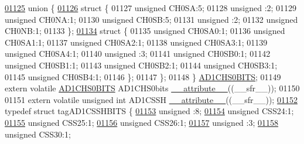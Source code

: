 \begin{DoxyCode}
\hypertarget{a00009_source_l01125}{}\hyperlink{a00009}{01125}   \textcolor{keyword}{union }\{
\hypertarget{a00009_source_l01126}{}\hyperlink{a00009}{01126}     \textcolor{keyword}{struct }\{
01127       \textcolor{keywordtype}{unsigned} CH0SA:5;
01128       \textcolor{keywordtype}{unsigned} :2;
01129       \textcolor{keywordtype}{unsigned} CH0NA:1;
01130       \textcolor{keywordtype}{unsigned} CH0SB:5;
01131       \textcolor{keywordtype}{unsigned} :2;
01132       \textcolor{keywordtype}{unsigned} CH0NB:1;
01133     \};
\hypertarget{a00009_source_l01134}{}\hyperlink{a00009}{01134}     \textcolor{keyword}{struct }\{
01135       \textcolor{keywordtype}{unsigned} CH0SA0:1;
01136       \textcolor{keywordtype}{unsigned} CH0SA1:1;
01137       \textcolor{keywordtype}{unsigned} CH0SA2:1;
01138       \textcolor{keywordtype}{unsigned} CH0SA3:1;
01139       \textcolor{keywordtype}{unsigned} CH0SA4:1;
01140       \textcolor{keywordtype}{unsigned} :3;
01141       \textcolor{keywordtype}{unsigned} CH0SB0:1;
01142       \textcolor{keywordtype}{unsigned} CH0SB1:1;
01143       \textcolor{keywordtype}{unsigned} CH0SB2:1;
01144       \textcolor{keywordtype}{unsigned} CH0SB3:1;
01145       \textcolor{keywordtype}{unsigned} CH0SB4:1;
01146     \};
01147   \};
01148 \} \hyperlink{a00008_d0/d89/a00071}{AD1CHS0BITS};
01149 \textcolor{keyword}{extern} \textcolor{keyword}{volatile} \hyperlink{a00008_d0/d89/a00071}{AD1CHS0BITS} AD1CHS0bits \hyperlink{a00009_a493c46f03454991ccc5aa7a6e1dfb2a7}{\_\_attribute\_\_}((\_\_sfr\_\_));
01150 
01151 \textcolor{keyword}{extern} \textcolor{keyword}{volatile} \textcolor{keywordtype}{unsigned} \textcolor{keywordtype}{int}  AD1CSSH \hyperlink{a00009_a493c46f03454991ccc5aa7a6e1dfb2a7}{\_\_attribute\_\_}((\_\_sfr\_\_));
\hypertarget{a00009_source_l01152}{}\hyperlink{a00008}{01152} \textcolor{keyword}{typedef} \textcolor{keyword}{struct }tagAD1CSSHBITS \{
\hypertarget{a00009_source_l01153}{}\hyperlink{a00008_adf71f3d8410c1f1dbbc96680a92c49af}{01153}   \textcolor{keywordtype}{unsigned} :8;
\hypertarget{a00009_source_l01154}{}\hyperlink{a00008_a179594fd85a0024675d34825b096e673}{01154}   \textcolor{keywordtype}{unsigned} CSS24:1;
\hypertarget{a00009_source_l01155}{}\hyperlink{a00008_a23d4f62cc0a980ee2d9fa1110338c65a}{01155}   \textcolor{keywordtype}{unsigned} CSS25:1;
\hypertarget{a00009_source_l01156}{}\hyperlink{a00008_a3aa55caf4abfc1b2814cbbaf8459c987}{01156}   \textcolor{keywordtype}{unsigned} CSS26:1;
\hypertarget{a00009_source_l01157}{}\hyperlink{a00008_acaf2d0924a107ec6e8d2e31febaf66f9}{01157}   \textcolor{keywordtype}{unsigned} :3;
\hypertarget{a00009_source_l01158}{}\hyperlink{a00008_a361b68bd74d71746af4c98eae8e3d16a}{01158}   \textcolor{keywordtype}{unsigned} CSS30:1;

\end{DoxyCode}
